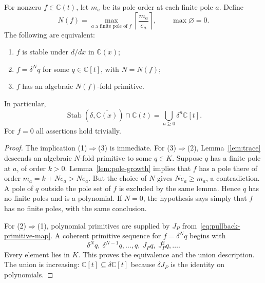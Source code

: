 \begin{theorem}
\label{thm:cover-classification}
For nonzero $f\in\mathbb C(t)$, let $m_a$ be its pole order at each
finite pole $a$. Define
\begin{equation}\label{eq:N-bound}
 N(f)=\max_{a\text{ a finite pole of }f}
              \left\lceil\frac{m_a}{e_a}\right\rceil,
 \qquad \max\varnothing=0.
\end{equation}
The following are equivalent:
\begin{enumerate}
\item $f$ is stable under $d/dx$ in $\overline{\mathbb C(x)}$;
\item $f=\delta^Nq$ for some $q\in\mathbb C[t]$, with $N=N(f)$;
\item $f$ has an algebraic $N(f)$-fold primitive.
\end{enumerate}
In particular,
\begin{equation}\label{eq:stable-union}
 \operatorname{Stab}(\delta,\overline{\mathbb C(x)})\cap\mathbb C(t)
   =\bigcup_{n\ge0}\delta^n\mathbb C[t].
\end{equation}
For $f=0$ all assertions hold trivially.
\end{theorem}
\begin{proof}
The implication (1)$\Rightarrow$(3) is immediate. For (3)$\Rightarrow$(2),
Lemma~\ref{lem:trace} descends an algebraic $N$-fold primitive to some
$q\in K$. Suppose $q$ has a finite pole at $a$, of order $k>0$.
Lemma~\ref{lem:pole-growth} implies that $f$ has a pole there of order
$m_a=k+Ne_a>Ne_a$. But the choice of $N$ gives $Ne_a\ge m_a$, a
contradiction. A pole of $q$ outside the pole set of $f$ is excluded by
the same lemma. Hence $q$ has no finite poles and is a polynomial.
If $N=0$, the hypothesis says simply that $f$ has no finite poles, with
the same conclusion.

For (2)$\Rightarrow$(1), polynomial primitives are supplied by $J_P$
from~\eqref{eq:pullback-primitive-map}. A coherent primitive sequence
for $f=\delta^Nq$ begins with
\[
 \delta^Nq,\ \delta^{N-1}q,\ldots,q,\ J_Pq,\ J_P^2q,\ldots.
\]
Every element lies in $K$. This proves the equivalence and the union
description. The union is increasing: $\mathbb C[t]\subseteq
\delta\mathbb C[t]$ because $\delta J_P$ is the identity on polynomials.
\end{proof}

